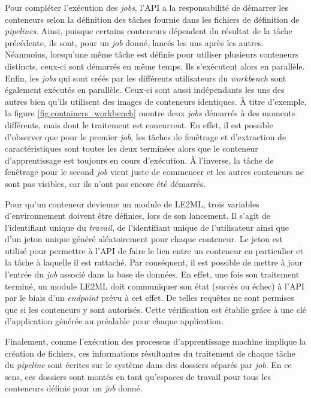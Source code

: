 Pour compléter l'exécution des \emph{jobs}, l'\acs{API} a la responsabilité de démarrer les conteneurs selon la définition des tâches fournie dans les fichiers de définition de \textit{pipelines}. Ainsi, puisque certains conteneurs dépendent du résultat de la tâche précédente, ils sont, pour un \emph{job} donné, lancés les uns après les autres. Néanmoins, lorsqu'une même tâche est définie pour utiliser plusieurs conteneurs distincts, ceux-ci sont démarrés en même temps. Ils s'exécutent alors en parallèle. Enfin, les \emph{jobs} qui sont créés par les différents utilisateurs du \textit{workbench} sont également exécutés en parallèle. Ceux-ci sont aussi indépendants les uns des autres bien qu'ils utilisent des images de conteneurs identiques. À titre d'exemple, la figure \ref{fig:containers_workbench} montre deux \emph{jobs} démarrés à des moments différents, mais dont le traitement est concurrent. En effet, il est possible d'observer que pour le premier \emph{job}, les tâches de fenêtrage et d'extraction de caractéristiques sont toutes les deux terminées alors que le conteneur d'apprentissage est toujours en cours d'exécution. À l'inverse, la tâche de fenêtrage pour le second \emph{job} vient juste de commencer et les autres conteneurs ne sont pas visibles, car ils n'ont pas encore été démarrés.

Pour qu'un conteneur devienne un module de \acs{LE2ML}, trois variables d'environnement doivent être définies, lors de son lancement. Il s'agit de l'identifiant unique du \emph{travail}, de l'identifiant unique de l'utilisateur ainsi que d'un jeton unique généré aléatoirement pour chaque conteneur. Le jeton est utilisé pour permettre à l'\acs{API} de faire le lien entre un conteneur en particulier et la tâche à laquelle il est rattaché. Par conséquent, il est possible de mettre à jour l'entrée du \emph{job} associé dans la base de données. En effet, une fois son traitement terminé, un module LE2ML doit communiquer son état (succès ou échec) à l'\acs{API} par le biais d'un \textit{endpoint} prévu à cet effet. De telles requêtes ne sont permises que si les conteneurs y sont autorisés. Cette vérification est établie grâce à une clé d'application générée au préalable pour chaque application.

Finalement, comme l'exécution des processus d'apprentissage machine implique la création de fichiers, ces informations résultantes du traitement de chaque tâche du \textit{pipeline} sont écrites sur le système dans des dossiers séparés par \emph{job}. En ce sens, ces dossiers sont montés en tant qu'espaces de travail pour tous les conteneurs définis pour un \emph{job} donné.

